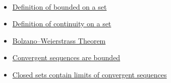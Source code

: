 \begin{remark*}[Dependencies]~\\
\begin{itemize}
  \item \hyperref[def:bounded-on-a-set]{Definition of bounded on a set}
  \item \hyperref[def:continuity-on-a-set]{Definition of continuity on a set}
  \item \hyperref[thm:bolzano-weierstrass]{Bolzano--Weierstrass Theorem}
  \item \hyperref[thm:convergent-implies-bounded]{Convergent sequences are bounded}
  \item \hyperref[prop:closed-sets-contain-limits]{Closed sets contain limits of convergent sequences}
\end{itemize}
\end{remark*}

